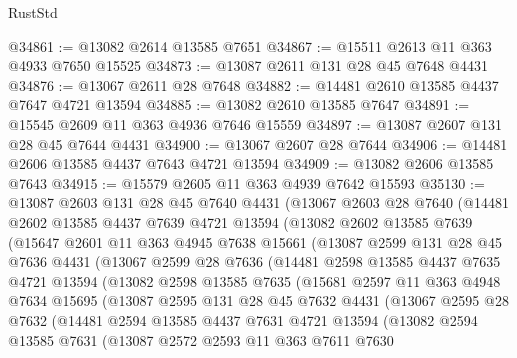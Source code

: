 \begin{lexlean}{RustStd}
\begin{coremodule}
@34861 := @13082 @2614 @13585 @7651
@34867 := @15511 @2613 @11 @363 @4933 @7650 @15525
@34873 := @13087 @2611 @131 @28 @45 @7648 @4431
@34876 := @13067 @2611 @28 @7648
@34882 := @14481 @2610 @13585 @4437 @7647 @4721 @13594
@34885 := @13082 @2610 @13585 @7647
@34891 := @15545 @2609 @11 @363 @4936 @7646 @15559
@34897 := @13087 @2607 @131 @28 @45 @7644 @4431
@34900 := @13067 @2607 @28 @7644
@34906 := @14481 @2606 @13585 @4437 @7643 @4721 @13594
@34909 := @13082 @2606 @13585 @7643
@34915 := @15579 @2605 @11 @363 @4939 @7642 @15593
@35130 := @13087
    @2603
    @131
    @28
    @45
    @7640
    @4431
    (@13067
      @2603
      @28
      @7640
      (@14481
        @2602
        @13585
        @4437
        @7639
        @4721
        @13594
        (@13082
          @2602
          @13585
          @7639
          (@15647
            @2601
            @11
            @363
            @4945
            @7638
            @15661
            (@13087
              @2599
              @131
              @28
              @45
              @7636
              @4431
              (@13067
                @2599
                @28
                @7636
                (@14481
                  @2598
                  @13585
                  @4437
                  @7635
                  @4721
                  @13594
                  (@13082
                    @2598
                    @13585
                    @7635
                    (@15681
                      @2597
                      @11
                      @363
                      @4948
                      @7634
                      @15695
                      (@13087
                        @2595
                        @131
                        @28
                        @45
                        @7632
                        @4431
                        (@13067
                          @2595
                          @28
                          @7632
                          (@14481
                            @2594
                            @13585
                            @4437
                            @7631
                            @4721
                            @13594
                            (@13082
                              @2594
                              @13585
                              @7631
                              (@13087
                                @2572
                                @2593
                                @11
                                @363
                                @7611
                                @7630

\end{coremodule}
\end{lexlean}
